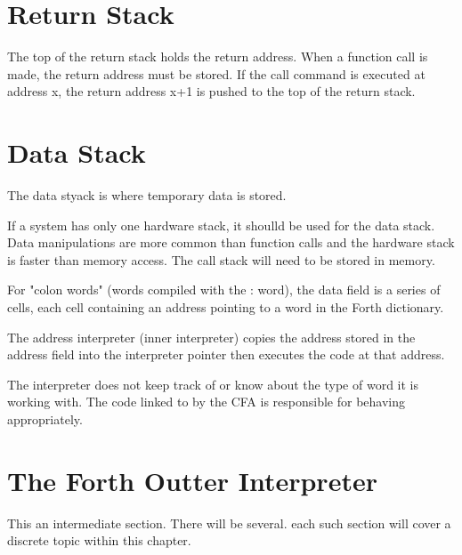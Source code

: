 \section{Return Stack}
The top of the return stack holds the return address. When a function call is made, the return address
must be stored.  If the call command is executed at address x, the return address x+1 is pushed to the top of the return stack.

\section{Data Stack}
The data styack is where temporary data is stored.

If a system has only one hardware stack, it shoulld be used for the data stack. Data 
manipulations are more common than function calls and the hardware stack is faster 
than memory access. The call stack will need to be stored in memory.

For "colon words" (words compiled with the : word), the data field is a series of cells, each cell
containing an address pointing to a word in the Forth dictionary.

The address interpreter (inner interpreter) copies the address stored in the address field
into the interpreter pointer then executes the code at that address.

The interpreter does not keep track of or know about the type of word it is working with. The code linked to by the CFA is responsible for behaving appropriately.

%
\section{The Forth Outter Interpreter}
This an intermediate section. There will be several. each such section will cover a
discrete topic within this chapter.


\blindtext
